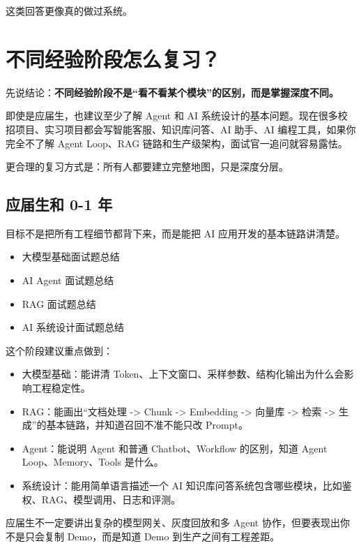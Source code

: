 \documentclass[10pt,a4paper]{ctexart}
\begin{document}
这类回答更像真的做过系统。



\section{不同经验阶段怎么复习？}


先说结论：\textbf{不同经验阶段不是“看不看某个模块”的区别，而是掌握深度不同。}



即使是应届生，也建议至少了解 Agent 和 AI 系统设计的基本问题。现在很多校招项目、实习项目都会写智能客服、知识库问答、AI 助手、AI 编程工具，如果你完全不了解 Agent Loop、RAG 链路和生产级架构，面试官一追问就容易露怯。



更合理的复习方式是：所有人都要建立完整地图，只是深度分层。



\subsection{应届生和 0-1 年}


目标不是把所有工程细节都背下来，而是能把 AI 应用开发的基本链路讲清楚。


\begin{itemize}[itemsep=2pt, topsep=4pt]
  \item 大模型基础面试题总结
  \item AI Agent 面试题总结
  \item RAG 面试题总结
  \item AI 系统设计面试题总结
\end{itemize}


这个阶段建议重点做到：


\begin{itemize}[itemsep=2pt, topsep=4pt]
  \item 大模型基础：能讲清 Token、上下文窗口、采样参数、结构化输出为什么会影响工程稳定性。
  \item RAG：能画出“文档处理 -> Chunk -> Embedding -> 向量库 -> 检索 -> 生成”的基本链路，并知道召回不准不能只改 Prompt。
  \item Agent：能说明 Agent 和普通 Chatbot、Workflow 的区别，知道 Agent Loop、Memory、Tools 是什么。
  \item 系统设计：能用简单语言描述一个 AI 知识库问答系统包含哪些模块，比如鉴权、RAG、模型调用、日志和评测。
\end{itemize}


应届生不一定要讲出复杂的模型网关、灰度回放和多 Agent 协作，但要表现出你不是只会复制 Demo，而是知道 Demo 到生产之间有工程差距。
\end{document}
